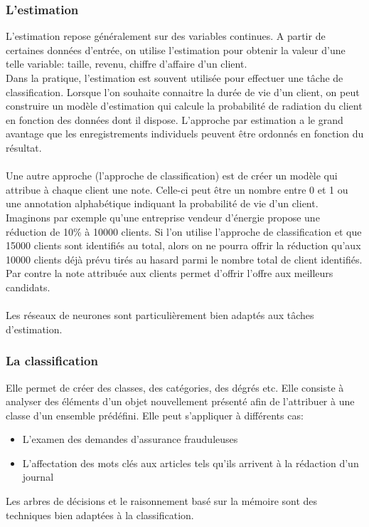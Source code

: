 \documentclass[11pt,a4paper]{report}
\begin{document}
\subsubsection{L'estimation}
L’estimation repose généralement sur des variables continues. A partir de certaines données d’entrée, on utilise l’estimation pour obtenir la valeur d’une telle variable: taille, revenu, chiffre d’affaire d’un client.  \\
Dans la pratique, l’estimation est souvent utilisée pour effectuer une tâche de classification. Lorsque l’on souhaite connaitre la durée de vie d’un client, on peut construire un modèle d’estimation qui calcule la probabilité de radiation du client en fonction des données dont il dispose. L’approche par estimation a le grand avantage que les enregistrements individuels peuvent être ordonnés en fonction du résultat. \\ \\
Une autre approche (l’approche de classification) est de créer un modèle qui attribue à chaque client une note. Celle-ci peut être un nombre entre 0 et 1 ou une annotation alphabétique indiquant la probabilité de vie d’un client. Imaginons par exemple qu’une entreprise vendeur d’énergie propose une réduction de 10\% à 10000 clients. Si l’on utilise l’approche de classification et que 15000 clients sont identifiés au total, alors on ne pourra offrir la réduction qu’aux 10000 clients déjà prévu tirés au hasard parmi le nombre total de client identifiés. Par contre la note attribuée aux clients permet d’offrir l’offre aux meilleurs candidats. \\ \\
Les réseaux de neurones sont particulièrement bien adaptés aux tâches d’estimation. 
\subsubsection{La classification}
Elle permet de créer des classes, des catégories, des dégrés etc. Elle consiste à analyser des éléments d’un objet nouvellement présenté afin de l’attribuer à une classe d’un ensemble prédéfini.
Elle peut s’appliquer à différents cas: \\
\begin{itemize}
\item L'examen des demandes d’assurance frauduleuses
\item L’affectation des mots clés aux articles tels qu’ils arrivent à la rédaction d’un journal
\end{itemize}
Les arbres de décisions et le raisonnement basé sur la mémoire sont des techniques bien adaptées à la classification.
\end{document}
